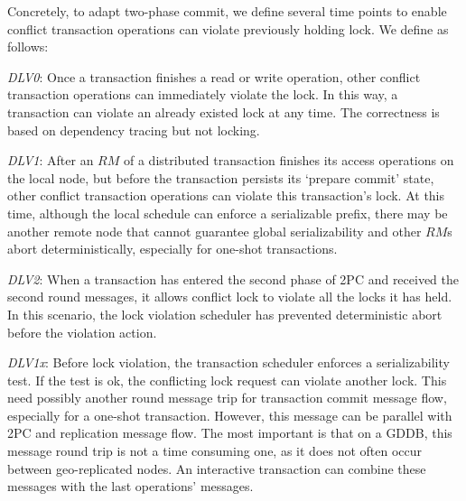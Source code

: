 \documentclass[conference]{IEEEtran}
\begin{document}
Concretely, to adapt two-phase commit, we define several time points to enable conflict transaction operations can violate previously holding lock.
We define as follows:

\emph{DLV0}: 
Once a transaction finishes a read or write operation, other conflict transaction operations can immediately violate the lock.
In this way, a transaction can violate an already existed lock at any time.
The correctness is based on dependency tracing but not locking.

\emph{DLV1}: 
After an ${RM}$ of a distributed transaction finishes its access operations on the local node, but before the transaction persists its `prepare commit' state, other conflict transaction operations can violate this transaction's lock.
At this time, although the local schedule can enforce a serializable prefix, there may be another remote node that cannot guarantee global serializability and other ${RM}$s abort deterministically, especially for one-shot transactions.

\emph{DLV2}: 
When a transaction has entered the second phase of 2PC and received the second round messages, it allows conflict lock to violate all the locks it has held.
In this scenario, the lock violation scheduler has prevented deterministic abort before the violation action.

\emph{DLV1x}: 
Before lock violation, the transaction scheduler enforces a serializability test.
If the test is ok, the conflicting lock request can violate another lock.
This need possibly another round message trip for transaction commit message flow, especially for a one-shot transaction.
However, this message can be parallel with 2PC and replication message flow.
The most important is that on a GDDB,  this message round trip is not a time consuming one, as it does not often occur between geo-replicated nodes.
An interactive transaction can combine these messages with the last operations' messages.
\end{document}
